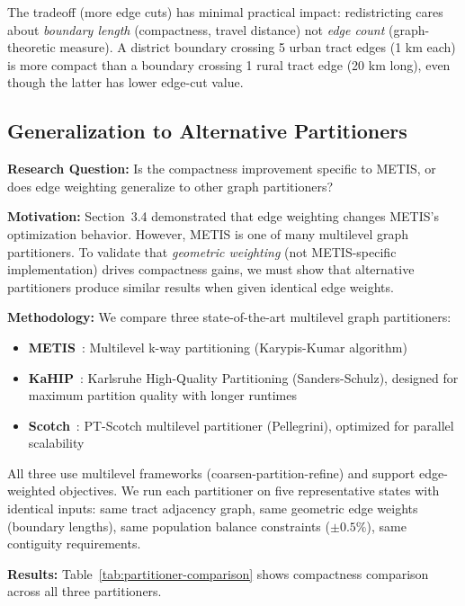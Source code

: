 The tradeoff (more edge cuts) has minimal practical impact: redistricting cares about \textit{boundary length} (compactness, travel distance) not \textit{edge count} (graph-theoretic measure). A district boundary crossing 5 urban tract edges (1 km each) is more compact than a boundary crossing 1 rural tract edge (20 km long), even though the latter has lower edge-cut value.

\subsection{Generalization to Alternative Partitioners}

\textbf{Research Question:} Is the compactness improvement specific to METIS, or does edge weighting generalize to other graph partitioners?

\textbf{Motivation:} Section~3.4 demonstrated that edge weighting changes METIS's optimization behavior. However, METIS is one of many multilevel graph partitioners. To validate that \textit{geometric weighting} (not METIS-specific implementation) drives compactness gains, we must show that alternative partitioners produce similar results when given identical edge weights.

\textbf{Methodology:} We compare three state-of-the-art multilevel graph partitioners:
\begin{itemize}
    \item \textbf{METIS}~\cite{karypis1998metis}: Multilevel k-way partitioning (Karypis-Kumar algorithm)
    \item \textbf{KaHIP}~\cite{sanders2013think}: Karlsruhe High-Quality Partitioning (Sanders-Schulz), designed for maximum partition quality with longer runtimes
    \item \textbf{Scotch}~\cite{pellegrini2008scotch}: PT-Scotch multilevel partitioner (Pellegrini), optimized for parallel scalability
\end{itemize}

All three use multilevel frameworks (coarsen-partition-refine) and support edge-weighted objectives. We run each partitioner on five representative states with identical inputs: same tract adjacency graph, same geometric edge weights (boundary lengths), same population balance constraints ($\pm 0.5\%$), same contiguity requirements.

\textbf{Results:} Table~\ref{tab:partitioner-comparison} shows compactness comparison across all three partitioners.




